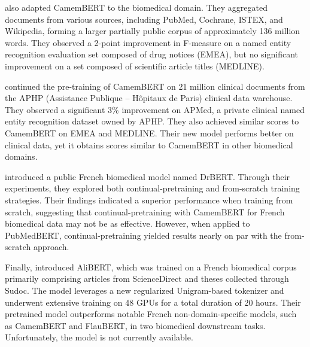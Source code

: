 \begin{reviewread}
\citet{le_clercq_de_lannoy_strategies_2022} also adapted CamemBERT to the biomedical domain. They aggregated documents from various sources, including PubMed, Cochrane, ISTEX, and Wikipedia, forming a larger partially public corpus of approximately 136 million words. They observed a 2-point improvement in F-measure on a named entity recognition evaluation set composed of drug notices (EMEA), but no significant improvement on a set composed of scientific article titles (MEDLINE).
\end{reviewread}

\begin{reviewread}
\citet{dura_learning_2022} continued the pre-training of CamemBERT on 21 million clinical documents from the APHP (Assistance Publique -- Hôpitaux de Paris) clinical data warehouse. They observed a significant 3\% improvement on APMed, a private clinical named entity recognition dataset owned by APHP. They also achieved similar scores to CamemBERT on EMEA and MEDLINE. Their new model performs better on clinical data, yet it obtains scores similar to CamemBERT in other biomedical domains.
\end{reviewread}

\begin{reviewread}
\citet{labrak2023drbert} introduced a public French biomedical model named DrBERT. Through their experiments, they explored both continual-pretraining and from-scratch training strategies. Their findings indicated a superior performance when training from scratch, suggesting that continual-pretraining with CamemBERT for French biomedical data may not be as effective. However, when applied to PubMedBERT, continual-pretraining yielded results nearly on par with the from-scratch approach.
\end{reviewread}

\begin{reviewread}
Finally, \citet{berhe:hal-03911564} introduced AliBERT, which was trained on a French biomedical corpus primarily comprising articles from ScienceDirect and theses collected through Sudoc. The model leverages a new regularized Unigram-based tokenizer and underwent extensive training on 48 GPUs for a total duration of 20 hours. Their pretrained model outperforms notable French non-domain-specific models, such as CamemBERT and FlauBERT, in two biomedical downstream tasks. Unfortunately, the model is not currently available.
\end{reviewread}


